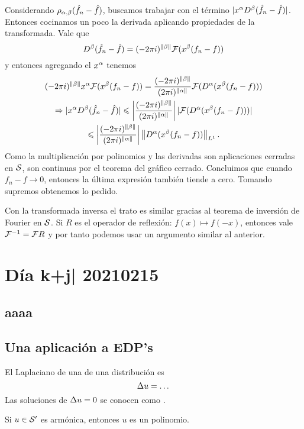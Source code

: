 \documentclass[12pt]{memoir}
\begin{document}
\begin{ptcbp}
  Considerando $\rho_{\alpha,\beta}(\hat{f}_n-\hat{f})$, buscamos trabajar con el término $|x^\alpha D^\beta(\hat{f}_n-\hat{f})|$. Entonces cocinamos un poco la derivada aplicando propiedades de la transformada. Vale que 
  $$
    D^\beta(\hat{f}_n-\hat{f})=(-2\pi i)^{\left\|\beta\right\|}\mathcal{F}(x^\beta(f_n-f))
  $$
  y entonces agregando el $x^\alpha$ tenemos 
  \begin{gather*}
    (-2\pi i)^{\left\|\beta\right\|}x^\alpha\mathcal{F}(x^\beta(f_n-f))=\frac{(-2\pi i)^{\left\|\beta\right\|}}{(2\pi i)^{\left\|\alpha\right\|}}\mathcal{F}(D^\alpha (x^\beta(f_n-f)))\\
    \Rightarrow|x^\alpha D^\beta(\hat{f}_n-\hat{f})|\leqslant \left|\frac{(-2\pi i)^{\left\|\beta\right\|}}{(2\pi i)^{\left\|\alpha\right\|}}\right||\mathcal{F}(D^\alpha (x^\beta(f_n-f)))|\\
    \leqslant \left|\frac{(-2\pi i)^{\left\|\beta\right\|}}{(2\pi i)^{\left\|\alpha\right\|}}\right|\left\|D^\alpha (x^\beta(f_n-f))\right\|_{L^1}.
  \end{gather*}
  Como la multiplicación por polinomios y las derivadas son aplicaciones cerradas en $\mathcal{S}$, son continuas por el teorema del gráfico cerrado. Concluimos que cuando $f_n-f\to 0$, entonces la última expresión también tiende a cero. Tomando supremos obtenemos lo pedido.\par 
  Con la transformada inversa el trato es similar gracias al teorema de inversión de Fourier en $\mathcal{S}$. Si $R$ es el operador de reflexión: $f(x)\mapsto f(-x)$, entonces vale $\mathcal{F}^{-1}=\mathcal{F} R$ y por tanto podemos usar un argumento similar al anterior.
\end{ptcbp}

\section{Día k+j| 20210215}

\subsection{aaaa}

\subsection{Una aplicación a EDP's}

El Laplaciano de una de una distribución es 
$$\Delta u=\dots$$
Las soluciones de $\Delta u=0$ se conocen como . 

\begin{Cor}
  Si $u\in\mathcal{S}'$ es armónica, entonces $u$ es un polinomio.
\end{Cor}
\end{document}

